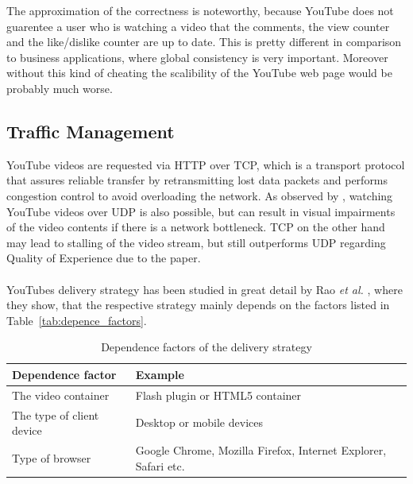 The approximation of the correctness is noteworthy, because YouTube does not guarentee a user who is watching a video that the comments, the view counter and the like/dislike counter are up to date. This is pretty different in comparison to business applications, where global consistency is very important. Moreover without this kind of cheating the scalibility of the YouTube web page would be probably much worse.

\subsection{Traffic Management}

YouTube videos are requested via HTTP over TCP, which is a transport protocol that assures reliable transfer by retransmitting lost data packets and performs congestion control to avoid overloading the network. As observed by \cite{inc:transport_protocols}, watching YouTube videos over UDP is also possible, but can result in visual impairments of the video contents if there is a network bottleneck. TCP on the other hand may lead to stalling of the video stream, but still outperforms UDP regarding Quality of Experience due to the paper. \\
\\
YouTubes delivery strategy has been studied in great detail by Rao \emph{et al.} \cite{inp:network_characteristics}, where they show, that the respective strategy mainly depends on the factors listed in Table~\vref{tab:depence_factors}.

\begin{table}[htbp]
  \begin{center}
    \begin{tabularx}{\textwidth}{|l|X|}
      \hline
      \textbf{Dependence factor} & \textbf{Example} \\
      \hline
      \hline
      The video container & Flash plugin or HTML5 container \\
      \hline
      The type of client device & Desktop or mobile devices \\
      \hline 
      Type of browser & Google Chrome, Mozilla Firefox, Internet Explorer, Safari etc. \\
      \hline
    \end{tabularx}
    \caption{Dependence factors of the delivery strategy}
    \label{tab:depence_factors}
  \end{center}
\end{table}


